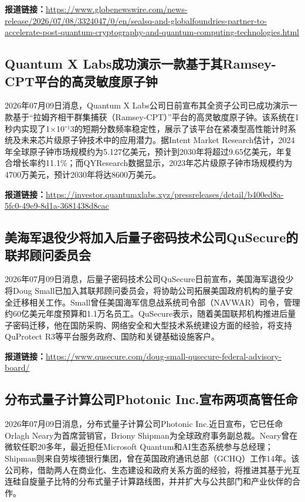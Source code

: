 \documentclass[12pt,a4paper]{ctexart}
\begin{document}
\noindent\textbf{报道链接：}\url{https://www.globenewswire.com/news-release/2026/07/08/3324047/0/en/sealsq-and-globalfoundries-partner-to-accelerate-post-quantum-cryptography-and-quantum-computing-technologies.html}

\subsection{ Quantum X Labs成功演示一款基于其Ramsey-CPT平台的高灵敏度原子钟 }

2026年07月09日消息，Quantum X Labs公司日前宣布其全资子公司已成功演示一款基于“拉姆齐相干群集捕获（Ramsey-CPT）”平台的高灵敏度原子钟。该系统在1秒内实现了1×10⁻¹3的短期分数频率稳定性，展示了该平台在紧凑型高性能计时系统及未来芯片级原子钟技术中的应用潜力。据Intent Market Research估计，2024年全球原子钟市场规模约为5.127亿美元，预计到2030年将超过9.65亿美元，年复合增长率约11.1\%；而QYResearch数据显示，2023年芯片级原子钟市场规模约为4700万美元，预计2030年将达8600万美元。

\noindent\textbf{报道链接：}\url{https://investor.quantumxlabs.xyz/pressreleases/detail/b400ed8a-5fc0-49e9-8d1a-3681438d8cac}

\subsection{ 美海军退役少将加入后量子密码技术公司QuSecure的联邦顾问委员会 }

2026年07月09日消息，后量子密码技术公司QuSecure日前宣布，美国海军退役少将Doug Small已加入其联邦顾问委员会，将协助公司拓展美国政府机构的量子安全迁移相关工作。Small曾任美国海军信息战系统司令部（NAVWAR）司令，管理约60亿美元年度预算和1.1万名员工。QuSecure表示，随着美国联邦机构推进后量子密码迁移，他在国防采购、网络安全和大型技术系统建设方面的经验，将支持QuProtect R3等平台服务政府、国防和关键基础设施客户。

\noindent\textbf{报道链接：}\url{https://www.qusecure.com/doug-small-qusecure-federal-advisory-board/}

\subsection{ 分布式量子计算公司Photonic Inc.宣布两项高管任命 }

2026年07月09日消息，分布式量子计算公司Photonic Inc.近日宣布，它已任命Orlagh Neary为首席营销官，Briony Shipman为全球政府事务副总裁。Neary曾在微软任职20多年，最近担任Microsoft Quantum和AI生态系统参与总经理；Shipman则来自劳埃德银行集团，曾在英国政府通讯总部（GCHQ）工作14年。该公司称，借助两人在商业化、生态建设和政府关系方面的经验，将推进其基于光互连硅自旋量子比特的分布式量子计算路线图，并并扩大与公共部门和产业伙伴的合作。
\end{document}
